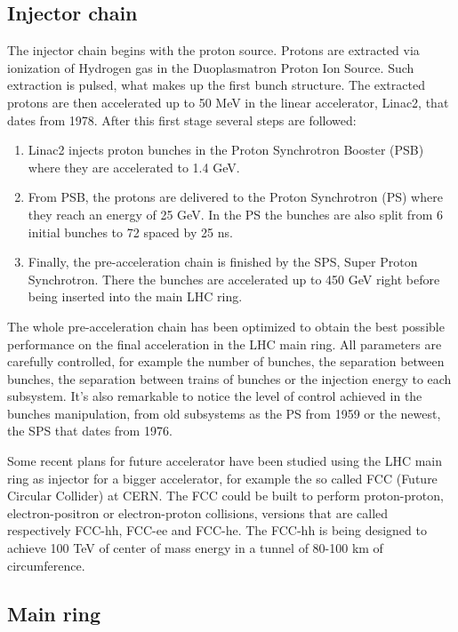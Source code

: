 \subsection{Injector chain}
\label{sec:injector}

The injector chain begins with the proton source. Protons are extracted via ionization of Hydrogen gas in the Duoplasmatron Proton Ion Source. Such extraction is pulsed, what makes up the first bunch structure. The extracted protons are then accelerated up to 50 MeV in the linear accelerator, Linac2, that dates from 1978. After this first stage several steps are followed:
\begin{enumerate}
\item Linac2 injects proton bunches in the Proton Synchrotron Booster (PSB) where they are accelerated to 1.4 GeV. 
\item From PSB, the protons are delivered to the Proton Synchrotron (PS) where they reach an energy of 25 GeV. In the PS the bunches are also split from 6 initial bunches to 72 spaced by 25 ns.
\item Finally, the pre-acceleration chain is finished by the SPS, Super Proton Synchrotron. There the bunches are accelerated up to 450 GeV right before being inserted into the main LHC ring. 
\end{enumerate}

The whole pre-acceleration chain has been optimized to obtain the best possible performance on the final acceleration in the LHC main ring. All parameters are carefully controlled, for example the number of bunches, the separation between bunches, the separation between trains of bunches or the injection energy to each subsystem. It's also remarkable to notice the level of control achieved in the bunches manipulation, from old subsystems as the PS from 1959 or the newest, the SPS that dates from 1976. 

Some recent plans for future accelerator have been studied using the LHC main ring as injector for a bigger accelerator, for example the so called FCC (Future Circular Collider) at CERN. The FCC could be built to perform proton-proton, electron-positron or electron-proton collisions, versions that are called respectively FCC-hh, FCC-ee and FCC-he. The FCC-hh is being designed to achieve 100 TeV of center of mass energy in a tunnel of 80-100 km of circumference. 

\subsection{Main ring}
\label{sec:ring}

